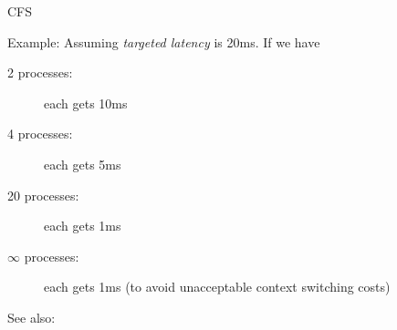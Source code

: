 \begin{frame}{CFS}
  \begin{block}{Example: }
    Assuming \emph{targeted latency} is 20ms. If we have
    \begin{description}
    \item[2 processes:] each gets 10ms
    \item[4 processes:] each gets 5ms
    \item[20 processes:] each gets 1ms
    \item[$\infty$ processes:] each gets 1ms (to avoid unacceptable context switching costs)
    \end{description}
  \end{block}
\end{frame}

See also: 

  

